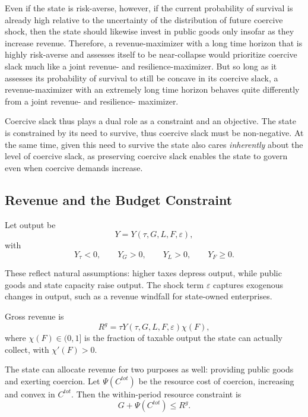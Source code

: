 \documentclass[12pt]{article}
\begin{document}
Even if the state is risk-averse, however, if the current probability of survival is already high relative to the uncertainty of the distribution of future coercive shock, then the state should likewise invest in public goods only insofar as they increase revenue. Therefore, a revenue-maximizer with a long time horizon that is highly risk-averse and assesses itself to be near-collapse would prioritize coercive slack much like a joint revenue- and resilience-maximizer. But so long as it assesses its probability of survival to still be concave in its coercive slack, a revenue-maximizer with an extremely long time horizon behaves quite differently from a joint revenue- and resilience- maximizer.

Coercive slack thus plays a dual role as a constraint and an objective. The state is constrained by its need to survive, thus coercive slack must be non-negative. At the same time, given this need to survive the state also cares \textit{inherently} about the level of coercive slack, as preserving coercive slack enables the state to govern even when coercive demands increase.

\subsection{Revenue and the Budget Constraint}

Let output be
\begin{equation}
Y = Y(\tau,G,L,F,\varepsilon),
\end{equation}
with
\begin{equation}
Y_{\tau} < 0, \qquad Y_G > 0, \qquad Y_L > 0, \qquad Y_F \ge 0.
\end{equation}

These reflect natural assumptions: higher taxes depress output, while public goods and state capacity raise output. The shock term $\varepsilon$ captures exogenous changes in output, such as a revenue windfall for state-owned enterprises.

Gross revenue is
\begin{equation}
R^g = \tau Y(\tau,G,L,F,\varepsilon)\chi(F),
\end{equation}
where $\chi(F) \in (0,1]$ is the fraction of taxable output the state can actually collect, with $\chi'(F)>0$.

The state can allocate revenue for two purposes as well: providing public goods and exerting coercion. Let $\Psi(C^{tot})$ be the resource cost of coercion, increasing and convex in $C^{tot}$. Then the within-period resource constraint is
\begin{equation}
G + \Psi(C^{tot}) \le R^g.
\end{equation}
\end{document}
